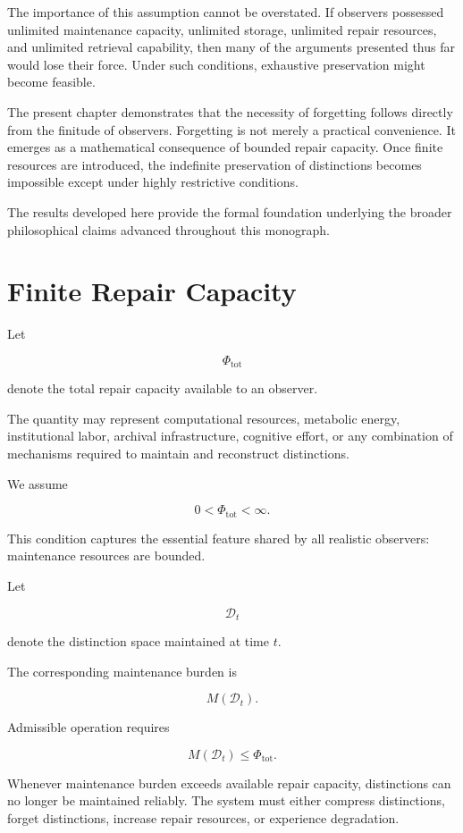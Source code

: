 \documentclass[12pt,oneside]{book}
\theoremstyle{plain} \newtheorem{theorem}{Theorem}[chapter] \newtheorem{lemma}[theorem]{Lemma} \newtheorem{proposition}[theorem]{Proposition} \newtheorem{corollary}[theorem]{Corollary}
\theoremstyle{definition} \newtheorem{definition}[theorem]{Definition} \newtheorem{axiom}[theorem]{Axiom} \newtheorem{construction}[theorem]{Construction}
\theoremstyle{remark} \newtheorem{remark}[theorem]{Remark} \newtheorem{example}[theorem]{Example}
\newcommand{\D}{\mathcal{D}} \newcommand{\R}{\mathcal{R}} \newcommand{\F}{\mathcal{F}} \newcommand{\U}{\mathcal{U}} \newcommand{\M}{\mathcal{M}} \newcommand{\G}{\Gamma}
\begin{document}
The importance of this assumption cannot be overstated. If observers possessed unlimited maintenance capacity, unlimited storage, unlimited repair resources, and unlimited retrieval capability, then many of the arguments presented thus far would lose their force. Under such conditions, exhaustive preservation might become feasible.

The present chapter demonstrates that the necessity of forgetting follows directly from the finitude of observers. Forgetting is not merely a practical convenience. It emerges as a mathematical consequence of bounded repair capacity. Once finite resources are introduced, the indefinite preservation of distinctions becomes impossible except under highly restrictive conditions.

The results developed here provide the formal foundation underlying the broader philosophical claims advanced throughout this monograph.

\section{Finite Repair Capacity}

Let

\[
\Phi_{\mathrm{tot}}
\]

denote the total repair capacity available to an observer.

The quantity may represent computational resources, metabolic energy, institutional labor, archival infrastructure, cognitive effort, or any combination of mechanisms required to maintain and reconstruct distinctions.

We assume

\[
0
<
\Phi_{\mathrm{tot}}
<
\infty.
\]

This condition captures the essential feature shared by all realistic observers: maintenance resources are bounded.

Let

\[
\D_t
\]

denote the distinction space maintained at time $t$.

The corresponding maintenance burden is

\[
M(\D_t).
\]

Admissible operation requires

\[
M(\D_t)
\leq
\Phi_{\mathrm{tot}}.
\]

Whenever maintenance burden exceeds available repair capacity, distinctions can no longer be maintained reliably. The system must either compress distinctions, forget distinctions, increase repair resources, or experience degradation.
\end{document}

